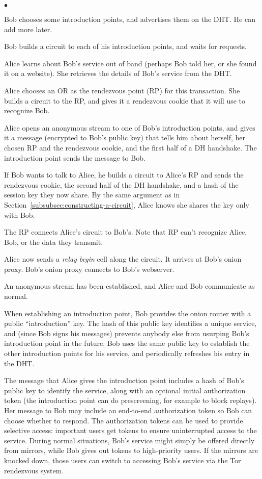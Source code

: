 \documentclass[times,10pt,twocolumn]{article}
\newenvironment{tightlist}{\begin{list}{$\bullet$}{
  \setlength{\itemsep}{0mm}
    \setlength{\parsep}{0mm}
    }}{\end{list}}
\begin{document}
\begin{tightlist}
\item Bob chooses some introduction points, and advertises them on
      the DHT.  He can add more later.
\item Bob builds a circuit to each of his introduction points,
      and waits for requests.
\item Alice learns about Bob's service out of band (perhaps Bob told her,
      or she found it on a website). She retrieves the details of Bob's
      service from the DHT.
\item Alice chooses an OR as the rendezvous point (RP) for this
      transaction. She builds a circuit to the RP, and gives it a
      rendezvous cookie that it will use to recognize Bob.
\item Alice opens an anonymous stream to one of Bob's introduction
      points, and gives it a message (encrypted to Bob's public key)
      that tells him
      about herself, her chosen RP and the rendezvous cookie, and the
      first half of a DH
      handshake. The introduction point sends the message to Bob.
\item If Bob wants to talk to Alice, he builds a circuit to Alice's
      RP and sends the rendezvous cookie, the second half of the DH
      handshake, and a hash of the session
      key they now share. By the same argument as in
      Section~\ref{subsubsec:constructing-a-circuit}, Alice knows she
      shares the key only with Bob.
\item The RP connects Alice's circuit to Bob's. Note that RP can't
      recognize Alice, Bob, or the data they transmit.
\item Alice now sends a \emph{relay begin} cell along the circuit. It
      arrives at Bob's onion proxy. Bob's onion proxy connects to Bob's
      webserver.
\item An anonymous stream has been established, and Alice and Bob
      communicate as normal.
\end{tightlist}

When establishing an introduction point, Bob provides the onion router
with a public ``introduction'' key. The hash of this public key
identifies a unique service, and (since Bob signs his
messages) prevents anybody else from usurping Bob's introduction point
in the future. Bob uses the same public key to establish the other
introduction points for his service, and periodically refreshes his
entry in the DHT.

The message that Alice gives
the introduction point includes a hash of Bob's public key to identify
the service, along with an optional initial authorization token (the
introduction point can do prescreening, for example to block replays). Her
message to Bob may include an end-to-end authorization token so Bob
can choose whether to respond.
The authorization tokens can be used to provide selective access:
important users get tokens to ensure uninterrupted access to the
service. During normal situations, Bob's service might simply be offered
directly from mirrors, while Bob gives out tokens to high-priority users. If
the mirrors are knocked down,
those users can switch to accessing Bob's service via
the Tor rendezvous system.
\end{document}
